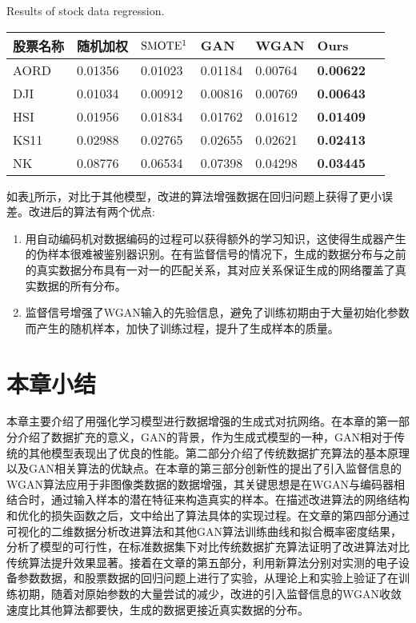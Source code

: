 \begin{table}[htpb]
	\centering
	{Results of stock data regression.}
	\label{tab2}
	\begin{tabular}{lllllll} \toprule		股票名称&随机加权&${\rm{SMOT}}{{\rm{E}}^1}$& GAN  & WGAN &Ours  \\ 
		\midrule
		AORD &0.01356& 0.01023&0.01184  & 0.00764 &\textbf{0.00622}   \\
		DJI &0.01034&0.00912&0.00816&0.00769&\textbf{0.00643}  \\
		HSI &0.01956&0.01834&0.01762&0.01612&\textbf{0.01409}  \\
		KS11 &0.02988&0.02765&0.02655&0.02621&\textbf{0.02413}\\
		NK  &0.08776&0.06534& 0.07398&  0.04298&\textbf{0.03445} \\
		\bottomrule
	\end{tabular}
\end{table}

如表\ref{tab2}所示，对比于其他模型，改进的算法增强数据在回归问题上获得了更小误差。改进后的算法有两个优点:
\begin{enumerate}
	\item 用自动编码机对数据编码的过程可以获得额外的学习知识，这使得生成器产生的伪样本很难被鉴别器识别。在有监督信号的情况下，生成的数据分布与之前的真实数据分布具有一对一的匹配关系，其对应关系保证生成的网络覆盖了真实数据的所有分布。
	\item 监督信号增强了WGAN输入的先验信息，避免了训练初期由于大量初始化参数而产生的随机样本，加快了训练过程，提升了生成样本的质量。
\end{enumerate}

\section{本章小结}

本章主要介绍了用强化学习模型进行数据增强的生成式对抗网络。在本章的第一部分介绍了数据扩充的意义，GAN的背景，作为生成式模型的一种，GAN相对于传统的其他模型表现出了优良的性能。第二部分介绍了传统数据扩充算法的基本原理以及GAN相关算法的优缺点。在本章的第三部分创新性的提出了引入监督信息的WGAN算法应用于非图像类数据的数据增强，其关键思想是在WGAN与编码器相结合时，通过输入样本的潜在特征来构造真实的样本。在描述改进算法的网络结构和优化的损失函数之后，文中给出了算法具体的实现过程。在文章的第四部分通过可视化的二维数据分析改进算法和其他GAN算法训练曲线和拟合概率密度结果，分析了模型的可行性，在标准数据集下对比传统数据扩充算法证明了改进算法对比传统算法提升效果显著。接着在文章的第五部分，利用新算法分别对实测的电子设备参数数据，和股票数据的回归问题上进行了实验，从理论上和实验上验证了在训练初期，随着对原始参数的大量尝试的减少，改进的引入监督信息的WGAN收敛速度比其他算法都要快，生成的数据更接近真实数据的分布。